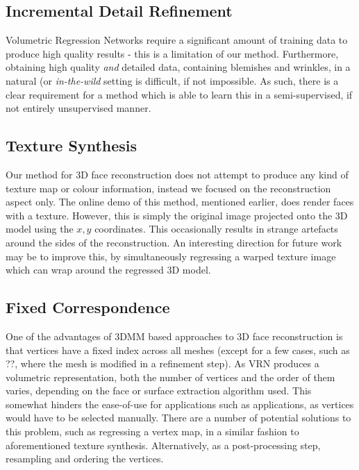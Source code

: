 \subsection{Incremental Detail Refinement} %

Volumetric Regression Networks require a significant amount of
training data to produce high quality results - this is a limitation
of our method. Furthermore, obtaining high quality \textit{and}
detailed data, containing blemishes and wrinkles, in a natural (or
\textit{in-the-wild} setting is difficult, if not impossible. As such,
there is a clear requirement for a method which is able to learn this
in a semi-supervised, if not entirely unsupervised manner.

\subsection{Texture Synthesis}

Our method for 3D face reconstruction does not attempt to produce any
kind of texture map or colour information, instead we focused on the
reconstruction aspect only. The online demo of this method, mentioned
earlier, does render faces with a texture. However, this is simply the
original image projected onto the 3D model using the $x,y$
coordinates. This occasionally results in strange artefacts around the
sides of the reconstruction. An interesting direction for future work
may be to improve this, by simultaneously regressing a warped texture
image which can wrap around the regressed 3D model.

\subsection{Fixed Correspondence}

One of the advantages of 3DMM based approaches to 3D face
reconstruction is that vertices have a fixed index across all meshes
(except for a few cases, such as ??, where the mesh is modified in a
refinement step). As VRN produces a volumetric representation, both
the number of vertices and the order of them varies, depending on the
face or surface extraction algorithm used. This somewhat hinders the
ease-of-use for applications such as applications, as vertices would
have to be selected manually. There are a number of potential
solutions to this problem, such as regressing a vertex map, in a
similar fashion to aforementioned texture synthesis. Alternatively, as
a post-processing step, resampling and ordering the vertices.



